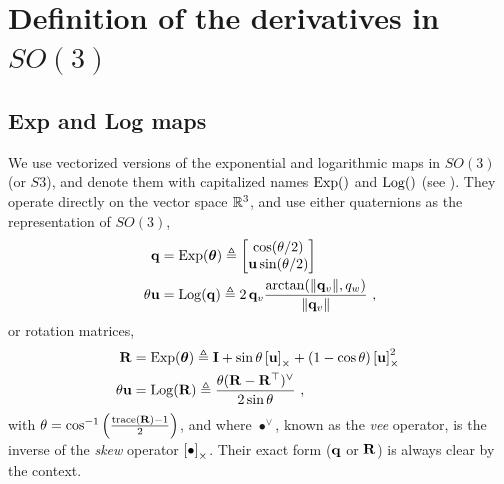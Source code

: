 
\appendices


\small

\section{Definition of the derivatives in $SO(3)$}
\label{sec:derivatives_SO3}

\subsection{Exp and Log maps}

We use vectorized versions of the exponential and logarithmic maps in $SO(3)$ (or $S3$), and denote them with capitalized names $\operatorname*{Exp}()$ and $\operatorname*{Log}()$ (see ). They operate directly on the vector space ${\mathbb R}^3$, and use either quaternions as the representation of $SO(3)$,
%
\begin{subequations}
\begin{align}
{\bf q}
&= \operatorname*{Exp}({{\bm \theta}}) \triangleq \begin{bmatrix}
\cos(\theta/2) \\ {\bf u}\sin(\theta/2)
\end{bmatrix}\\ 
\theta{\bf u} &= \operatorname*{Log}({\bf q}) \triangleq 2\,{{\bf q}_v}\frac{\arctan({{\left\|{{\bf q}_v}\right\|},q_w})}{{\left\|{{\bf q}_v}\right\|}}
~,
\end{align}
\end{subequations}
%
or rotation matrices, 
%
\begin{subequations}
\begin{align}
{\bf R}
&= \operatorname*{Exp}({{\bm \theta}}) \triangleq {\bf I} + \sin\theta\left[{\bf u}\right]_\times + (1-\cos\theta)\left[{\bf u}\right]_\times^2~ \label{equ:rodrigues} \\ 
\theta{\bf u} &= \operatorname*{Log}({\bf R}) \triangleq \frac{\theta({\bf R}-{\bf R}^{\top})^\vee}{2\sin\theta} 
~,
\end{align}
\end{subequations}
%
with $\theta=\cos^{-1}\left(\frac{\operatorname*{trace}({\bf R})-1}{2}\right)$,
and where $\bullet^\vee$, known as the \emph{vee} operator, is the inverse of the \emph{skew} operator $\left[\bullet\right]_\times$. 
Their exact form (${\bf q}$ or ${\bf R}$) is always clear by the context.





